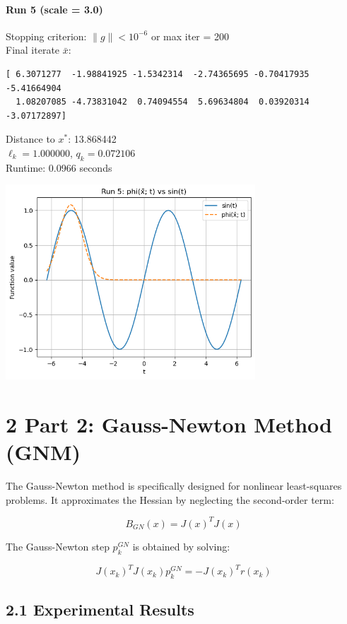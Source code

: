 \documentclass[12pt]{article}
\begin{document}
\paragraph{Run 5 (scale = 3.0)}
Stopping criterion: $\|g\| < 10^{-6}$ or max iter = 200\\
Final iterate $\bar{x}$:
\begin{verbatim}
[ 6.3071277  -1.98841925 -1.5342314  -2.74365695 -0.70417935 -5.41664904
  1.08207085 -4.73831042  0.74094554  5.69634804  0.03920314 -3.07172897]
\end{verbatim}
Distance to $x^*$: 13.868442\\
$\ell_k = 1.000000$, $q_k = 0.072106$\\
Runtime: 0.0966 seconds

\includegraphics[width=0.7\textwidth]{figures/plot_5.png}

\section*{2 Part 2: Gauss-Newton Method (GNM)}

The Gauss-Newton method is specifically designed for nonlinear least-squares problems. It approximates the Hessian by neglecting the second-order term:

\begin{equation}
B_{GN}(x) = J(x)^T J(x)
\end{equation}

The Gauss-Newton step $p_k^{GN}$ is obtained by solving:

\begin{equation}
J(x_k)^T J(x_k) p_k^{GN} = -J(x_k)^T r(x_k)
\end{equation}

\subsection*{2.1 Experimental Results}
\end{document}
